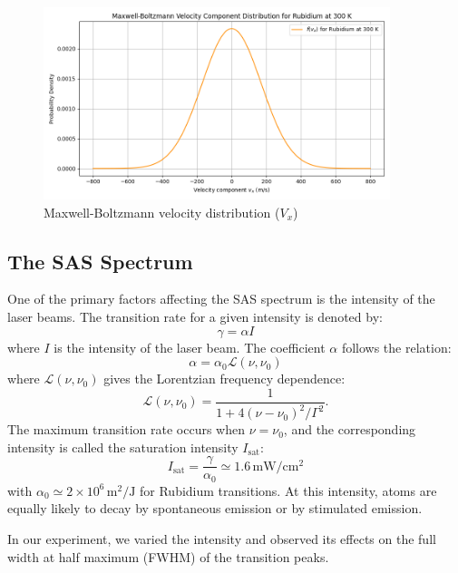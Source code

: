 \documentclass[a4paper, 12pt]{article}
\begin{document}
\begin{figure}[htbp]
    \centering
    \includegraphics[width=0.9\textwidth]{mb-velocity.png}
    \caption{Maxwell-Boltzmann velocity distribution ($V_x$)}
\end{figure}

\newpage

\subsection{The SAS Spectrum}
One of the primary factors affecting the SAS spectrum is the intensity of the laser beams. The transition rate for a given intensity is denoted by:
\[
    \gamma = \alpha I
\]
where $I$ is the intensity of the laser beam. The coefficient $\alpha$ follows the relation:
\[
    \alpha = \alpha_0 \mathcal{L}(\nu, \nu_0)
\]
where $\mathcal{L}(\nu, \nu_0)$ gives the Lorentzian frequency dependence:
\[
    \mathcal{L}(\nu, \nu_0) = \frac{1}{1 + 4(\nu - \nu_0)^2/\Gamma^2}.
\]
The maximum transition rate occurs when $\nu = \nu_0$, and the corresponding intensity is called the saturation intensity $I_{\text{sat}}$:
\[
    I_{\text{sat}} = \frac{\gamma}{\alpha_0} \simeq 1.6\,\mathrm{mW/cm^2}
\]
with $\alpha_0 \simeq 2 \times 10^{6}\,\mathrm{m^2/J}$ for Rubidium transitions. At this intensity, atoms are equally likely to decay by spontaneous emission or by stimulated emission.

In our experiment, we varied the intensity and observed its effects on the full width at half maximum (FWHM) of the transition peaks.
\end{document}
